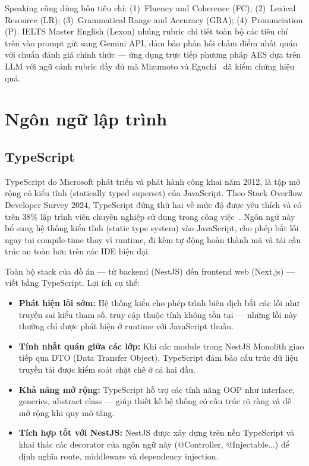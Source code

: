 Speaking cũng dùng bốn tiêu chí: (1)~Fluency and Coherence (FC); (2)~Lexical Resource (LR); (3)~Grammatical Range and Accuracy (GRA); (4)~Pronunciation (P). IELTS Master English (Lexon) nhúng rubric chi tiết toàn bộ các tiêu chí trên vào prompt gửi sang Gemini API, đảm bảo phản hồi chấm điểm nhất quán với chuẩn đánh giá chính thức --- ứng dụng trực tiếp phương pháp AES dựa trên LLM với ngữ cảnh rubric đầy đủ mà Mizumoto và Eguchi~\cite{mizumoto2023exploring} đã kiểm chứng hiệu quả.

\section{Ngôn ngữ lập trình}

\subsection{TypeScript}

TypeScript do Microsoft phát triển và phát hành công khai năm 2012, là tập mở rộng có kiểu tĩnh (statically typed superset) của JavaScript. Theo Stack Overflow Developer Survey 2024, TypeScript đứng thứ hai về mức độ được yêu thích và có trên 38\% lập trình viên chuyên nghiệp sử dụng trong công việc~\cite{stackoverflow-survey-2024}. Ngôn ngữ này bổ sung hệ thống kiểu tĩnh (static type system) vào JavaScript, cho phép bắt lỗi ngay tại compile-time thay vì runtime, đi kèm tự động hoàn thành mã và tái cấu trúc an toàn hơn trên các IDE hiện đại.

Toàn bộ stack của đồ án --- từ backend (NestJS) đến frontend web (Next.js) --- viết bằng TypeScript. Lợi ích cụ thể:

\begin{itemize}
    \item \textbf{Phát hiện lỗi sớm:} Hệ thống kiểu cho phép trình biên dịch bắt các lỗi như truyền sai kiểu tham số, truy cập thuộc tính không tồn tại --- những lỗi này thường chỉ được phát hiện ở runtime với JavaScript thuần.
    \item \textbf{Tính nhất quán giữa các lớp:} Khi các module trong NestJS Monolith giao tiếp qua DTO (Data Transfer Object), TypeScript đảm bảo cấu trúc dữ liệu truyền tải được kiểm soát chặt chẽ ở cả hai đầu.
    \item \textbf{Khả năng mở rộng:} TypeScript hỗ trợ các tính năng OOP như interface, generics, abstract class --- giúp thiết kế hệ thống có cấu trúc rõ ràng và dễ mở rộng khi quy mô tăng.
    \item \textbf{Tích hợp tốt với NestJS:} NestJS được xây dựng trên nền TypeScript và khai thác các decorator của ngôn ngữ này (@Controller, @Injectable...) để định nghĩa route, middleware và dependency injection.
\end{itemize}


